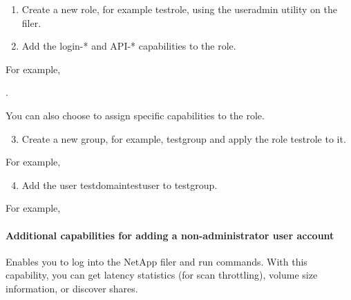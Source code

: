 \documentclass[letterpaper,10pt,english]{sphinxmanual}
\begin{document}
\begin{enumerate}
\item {} 
Create a new role, for example testrole, using the useradmin utility on the filer.

\item {} 
Add the login-* and API-* capabilities to the role.

\end{enumerate}

For example,

.

You can also choose to assign specific capabilities to the role.
\begin{enumerate}
\setcounter{enumi}{2}
\item {} 
Create a new group, for example, testgroup and apply the role testrole to it.

\end{enumerate}

For example,

\begin{enumerate}
\setcounter{enumi}{3}
\item {} 
Add the user testdomaintestuser to testgroup.

\end{enumerate}

For example,



\paragraph{Additional capabilities for adding a non-administrator user account}
\label{\detokenize{mcdmp_app_ug:additional-capabilities-for-adding-a-non-administrator-user-account}}



Enables you to log into the NetApp filer and run commands. With this capability, you can get latency statistics (for scan throttling), volume size information, or discover shares.


\end{document}
